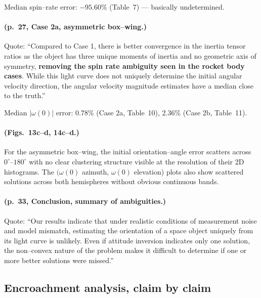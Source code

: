 \documentclass[11pt]{article}
\begin{document}
Median spin--rate error: $-95.60\%$ (Table~7) --- basically undetermined.

\paragraph{(p.~27, Case 2a, asymmetric box--wing.)}
Quote: ``Compared to Case 1, there is better convergence in the inertia
tensor ratios as the object has three unique moments of inertia and no
geometric axis of symmetry, \textbf{removing the spin rate ambiguity seen
in the rocket body cases}. While this light curve does not uniquely
determine the initial angular velocity direction, the angular velocity
magnitude estimates have a median close to the truth.''

Median $|\omega(0)|$ error: 0.78\% (Case 2a, Table~10), 2.36\% (Case 2b,
Table~11).

\paragraph{(Figs.~13c--d, 14c--d.)}
For the asymmetric box--wing, the initial orientation--angle error scatters
across $0^\circ$--$180^\circ$ with no clear clustering structure visible at
the resolution of their 2D histograms. The $(\omega(0)$ azimuth, $\omega(0)$
elevation) plots also show scattered solutions across both hemispheres
without obvious continuous bands.

\paragraph{(p.~33, Conclusion, summary of ambiguities.)}
Quote: ``Our results indicate that under realistic conditions of
measurement noise and model mismatch, estimating the orientation of a
space object uniquely from its light curve is unlikely. Even if attitude
inversion indicates only one solution, the non--convex nature of the
problem makes it difficult to determine if one or more better solutions
were missed.''

\subsection{Encroachment analysis, claim by claim}
\end{document}
